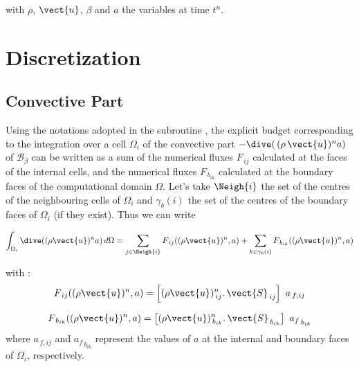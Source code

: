 with $\rho$, $\vect{u}$, $\beta$ and $a$ the variables at time  ${t^n}$.

\section*{Discretization}
\subsection*{\bf Convective Part}
Using the notations adopted in the subroutine , the
explicit budget corresponding to the integration over a cell
$\Omega_i$ of the convective part $-{\dive(\,(\rho\,\vect{u})^n a)}$
of $\mathcal{B_{\mathcal{\beta}}}$ can be written as a sum of the
numerical fluxes $F_{\,ij}$ calculated at the faces of the internal
cells, and the numerical fluxes $F_{\,b_{ik}}$ calculated at the
boundary faces of the computational domain $\Omega$. Let's take
$\Neigh{i}$ the set of the centres of the neighbouring cells of
${\Omega_i}$ and $\gamma_b(i)$ the set of the centres of the boundary
faces of ${\Omega_i}$ (if they exist). Thus we can write

\begin{equation}\notag
\int_{\Omega_i}{\dive( (\rho \vect{u})^n  a )\, d\Omega} =
\sum_{j\in \Neigh{i}}{F_{\,ij}((\rho \vect{u})^n, a)}
+\sum_{k\in {\gamma_b(i)}} {F_{\,{b}_{ik}}((\rho \vect{u})^n,a)}
\end{equation}

with :
\begin{equation}
F_{\,ij}((\rho \vect{u})^n,a) = \left[{(\rho \vect{u})_{\,ij}^n} \text{.}\, \vect{S}_{\,ij}\right]\ a_{\,f,ij}
\end{equation}

\begin{equation}
F_{\,{b}_{ik}}((\rho \vect{u})^n, a) =  \left[{(\rho \vect{u})_{\,{b}_{ik}}^n} \text{.}\, \vect{S}_{\,{b}_{ik}}\right]\ {a_f}_{\,{b}_{ik}}
\end{equation}
where $a_{\,f,ij}$ and ${a_f}_{\,{b}_{ik}}$ represent the values of
$a$ at the internal and boundary faces of ${\Omega_i}$, respectively.\\

